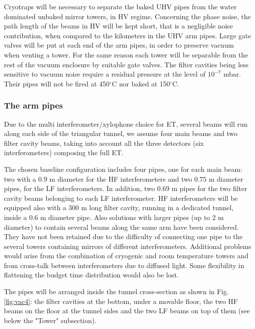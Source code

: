 Cryotraps will be necessary to separate the baked UHV pipes from the water dominated unbaked mirror towers, in HV regime. Concerning the phase noise, the path length of the beams in HV will be kept short, that is a negligible noise contribution, when compared to the kilometers in the UHV arm pipes.
Large gate valves will be put at each end of the arm pipes, in order to preserve vacuum when venting a tower. For the same reason each tower will be separable from the rest of the vacuum enclosure by suitable gate valves.
The filter cavities being less sensitive to vacuum noise require a residual pressure at the level of $10^{-7}$ mbar. Their pipes will not be fired at 450$^\circ$C nor baked at 150$^\circ$C.

\subsubsection{The arm pipes}

Due to the multi interferometer/xylophone choice for ET, several beams will run along each side of the triangular tunnel, we assume four main beams and two filter cavity beams, taking into account all the three detectors (six interferometers) composing the full ET.

The chosen baseline configuration includes four pipes, one for each main beam: two with a $0.9$ m diameter for the HF interferometers and two $0.75$ m diameter pipes, for the LF interferometers. In addition, two $0.69$ m pipes for the two filter cavity beams belonging to each LF interferometer. HF interferometers will be equipped also with a 300 m long filter cavity, running in a dedicated tunnel, inside a 0.6 m diameter pipe. Also solutions with larger pipes (up to 2 m diameter) to contain several beams along the same arm have been considered. They have not been retained due to the difficulty of connecting one pipe to the several towers containing mirrors of different interferometers. Additional problems would arise from the combination of cryogenic and room temperature towers and from cross-talk between interferometers due to diffused light. Some flexibility in flattening the budget time distribution would also be lost.

The pipes will be arranged inside the tunnel cross-section as shown in Fig. \ref{fig:vac4}: the filter cavities at the bottom, under a movable floor, the two HF beams on the floor at the tunnel sides and the two LF beams on top of them (see below the "Tower" subsection).

